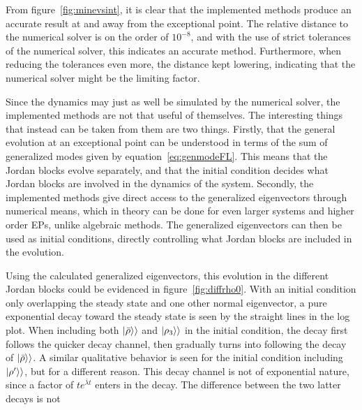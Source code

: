 \documentclass[../main.tex]{subfiles}
\begin{document}
From figure~\ref{fig:minevsint}, it is clear that the implemented methods produce an accurate result at and away from the exceptional point. The relative distance to the numerical solver is on the order of $10^{-8}$, and with the use of strict tolerances of the numerical solver, this indicates an accurate method. Furthermore, when reducing the tolerances even more, the distance kept lowering, indicating that the numerical solver might be the limiting factor.

Since the dynamics may just as well be simulated by the numerical solver, the implemented methods are not that useful of themselves. The interesting things that instead can be taken from them are two things. Firstly, that the general evolution at an exceptional point can be understood in terms of the sum of generalized modes given by equation~\eqref{eq:genmodeFL}. This means that the Jordan blocks evolve separately, and that the initial condition decides what Jordan blocks are involved in the dynamics of the system. Secondly, the implemented methods give direct access to the generalized eigenvectors through numerical means, which in theory can be done for even larger systems and higher order EPs, unlike algebraic methods. The generalized eigenvectors can then be used as initial conditions, directly controlling what Jordan blocks are included in the evolution.

Using the calculated generalized eigenvectors, this evolution in the different Jordan blocks could be evidenced in figure~\ref{fig:diffrho0}. With an initial condition only overlapping the steady state and one other normal eigenvector, a pure exponential decay toward the steady state is seen by the straight lines in the log plot. When including both $\ket{\bar \rho}\rangle$ and $\ket{\rho_3}\rangle$ in the initial condition, the decay first follows the quicker decay channel, then gradually turns into following the decay of $\ket{\bar\rho}\rangle$. A similar qualitative behavior is seen for the initial condition including $\ket{\rho'}\rangle$, but for a different reason. This decay channel is not of exponential nature, since a factor of $te^{\bar\lambda t}$ enters in the decay. The difference between the two latter decays is not 
\end{document}
